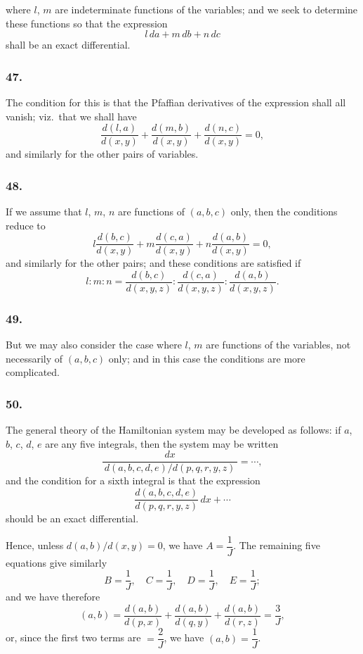 \documentclass[12pt,a4paper]{article}
\theoremstyle{plain}
\begin{document}
where $l$, $m$ are indeterminate functions of the variables; and we seek to determine these functions so that the expression
\[
l\,da + m\,db + n\,dc
\]
shall be an exact differential.

\subsubsection*{47.}

The condition for this is that the Pfaffian derivatives of the expression shall all vanish; viz.~that we shall have
\[
\frac{d(l, a)}{d(x, y)} + \frac{d(m, b)}{d(x, y)} + \frac{d(n, c)}{d(x, y)} = 0,
\]
and similarly for the other pairs of variables.

\subsubsection*{48.}

If we assume that $l$, $m$, $n$ are functions of $(a, b, c)$ only, then the conditions reduce to
\[
l\frac{d(b, c)}{d(x, y)} + m\frac{d(c, a)}{d(x, y)} + n\frac{d(a, b)}{d(x, y)} = 0,
\]
and similarly for the other pairs; and these conditions are satisfied if
\[
l : m : n = \frac{d(b, c)}{d(x, y, z)} : \frac{d(c, a)}{d(x, y, z)} : \frac{d(a, b)}{d(x, y, z)}.
\]

\newpage
\setcounter{page}{132}

\subsubsection*{49.}

But we may also consider the case where $l$, $m$ are functions of the variables, not necessarily of $(a, b, c)$ only; and in this case the conditions are more complicated.

\subsubsection*{50.}

The general theory of the Hamiltonian system may be developed as follows: if $a$, $b$, $c$, $d$, $e$ are any five integrals, then the system may be written
\[
\frac{dx}{\,d(a, b, c, d, e)/d(p, q, r, y, z)\,} = \cdots,
\]
and the condition for a sixth integral is that the expression
\[
\frac{d(a, b, c, d, e)}{d(p, q, r, y, z)}\,dx + \cdots
\]
should be an exact differential.

\newpage
\setcounter{page}{133}

Hence, unless $d(a, b)/d(x, y) = 0$, we have $A = \dfrac{1}{J}$. The remaining five equations give similarly
\[
B = \frac{1}{J}, \quad C = \frac{1}{J}, \quad D = \frac{1}{J}, \quad E = \frac{1}{J};
\]
and we have therefore
\[
(a, b) = \frac{d(a, b)}{d(p, x)} + \frac{d(a, b)}{d(q, y)} + \frac{d(a, b)}{d(r, z)} = \frac{3}{J},
\]
or, since the first two terms are $= \dfrac{2}{J}$, we have $(a, b) = \dfrac{1}{J}$.
\end{document}
